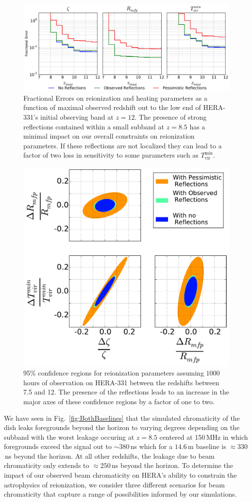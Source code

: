 \documentclass[twocolumn]{emulateapj}
\begin{document}
\begin{figure}
\includegraphics[width=\textwidth]{figures/sigmaVsZ_reionization_v2.pdf}
\caption{Fractional Errors on reionization and heating parameters as a function of maximal observed redshift out to the low end of HERA-331's initial observing band at $z=12$. The presence of strong reflections contained within a small subband at $z=8.5$ has a minimal impact on our overall constraints on reionization parameters. If these reflections are not localized they can lead to a factor of two loss in sensitivity to some parameters such as $T_\text{vir}^\text{min}$.}
\label{fig:Errors}
\end{figure}

\begin{figure}[h!]
\includegraphics[width=.5\textwidth]{figures/reionization_triangle_compare_v2.pdf}
\caption{95\% confidence regions for reionization parameters assuming $1000$ hours of observation on HERA-331 between the redshifts between 7.5 and 12. The presence of the reflections leads to an increase in the major axes of these confidence regions by a factor of one to two.}
\label{fig:Confidence}
\end{figure}


We have seen in Fig.~\ref{fig:BothBaselines} that the simulated chromaticity of the dish leaks foregrounds beyond the horizon to varying degrees depending on the subband with the worst leakage occuring at $z=8.5$ centered at 150\,MHz in which foregrounds exceed the signal out to $\sim 380$\,ns which for a $14.6$\,m baseline is $\approx 330$\,ns beyond the horizon. At all other redshifts, the leakage due to beam chromaticity only extends to $\approx 250$\,ns beyond the horizon. To determine the impact of our observed beam chromaticity on HERA's ability to constrain the astrophysics of reionization, we consider three different scenarios for beam chromaticity that capture a range of possibilities informed by our simulations. 
\end{document}
